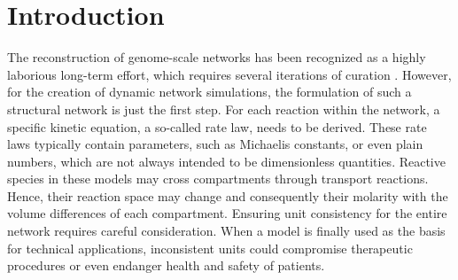 \documentclass{bioinfo}
\begin{document}
\section{Introduction}

The reconstruction of genome-scale networks has been recognized as a highly laborious long-term effort, which requires several iterations of curation \citep{Thiele2010}.
However, for the creation of dynamic network simulations, the formulation of such a structural network is just the first step.
For each reaction within the network, a specific kinetic equation, a so-called rate law, needs to be derived.
These rate laws typically contain parameters, such as Michaelis constants, or even plain numbers, which are not always intended to be dimensionless quantities.
Reactive species in these models may cross compartments through transport reactions.
Hence, their reaction space may change and consequently their molarity with the volume differences of each compartment.
Ensuring unit consistency for the entire network requires careful consideration.
When a model is finally used as the basis for technical applications, inconsistent units could compromise 
therapeutic procedures or even endanger health and safety of patients.
\end{document}
